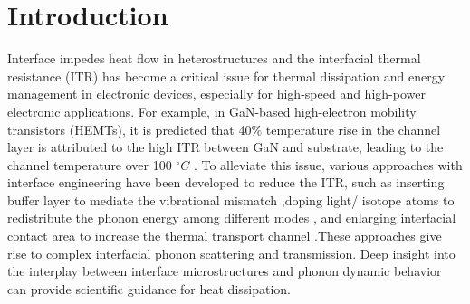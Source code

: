 \documentclass{article}
\begin{document}
\section{Introduction}

Interface impedes heat flow in heterostructures and the interfacial thermal resistance (ITR) has become a critical issue for thermal dissipation and energy management in electronic devices, especially for high-speed and high-power electronic applications. For example, in GaN-based high-electron mobility transistors (HEMTs), it is predicted that 40$\%$ temperature rise in the channel layer is attributed to the high ITR between GaN and substrate, leading to the channel temperature over 100 $^{\circ}C$  \cite{lee2018thermal}. To alleviate this issue, various approaches with interface engineering have been developed to reduce the ITR, such as inserting buffer layer to mediate the vibrational mismatch  \cite{hu2011large} \cite{lee2017role},doping light/ isotope atoms to redistribute the phonon energy among different modes  \cite{lee2018thermal} \cite{li2019effect}, and enlarging interfacial contact area to increase the thermal transport channel  \cite{tao2017interlaced} \cite{lee2016nanostructures}.These approaches give rise to complex interfacial phonon scattering and transmission.  Deep insight into the interplay between interface microstructures and phonon dynamic behavior can provide scientific guidance for heat dissipation. 
\end{document}
